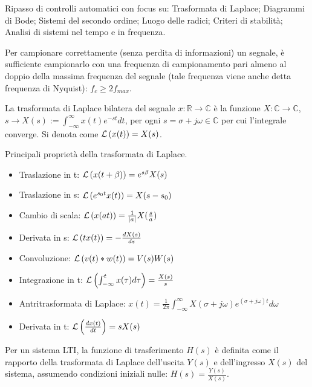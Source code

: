 Ripasso di controlli automatici con focus su: Trasformata di Laplace; Diagrammi di Bode; Sistemi del secondo ordine; Luogo delle radici; Criteri di stabilità; Analisi di sistemi nel tempo e in frequenza.

\label{th_Shannon}
Per campionare correttamente (senza perdita di informazioni) un segnale, è sufficiente campionarlo con una frequenza di campionamento pari almeno al doppio della massima frequenza del segnale (tale frequenza viene anche detta frequenza di Nyquist): \(f_c \geqslant 2 f_{max}\).

La trasformata di Laplace bilatera del segnale $x:\mathbb{R} \rightarrow \mathbb{C}$ è la funzione $X:\mathbb{C} \rightarrow \mathbb{C}$, $s \rightarrow X(s) := \int^\infty_{-\infty} x(t)e^{-st} dt $, per ogni $s=\sigma + j\omega\in \mathbb{C}$ per cui l'integrale converge. Si denota come $\mathcal{L}\left(x(t)\right) = X(s)$.

Principali proprietà della trasformata di Laplace.
\begin{itemize}
    \item Traslazione in t: $\mathcal{L}\left(x(t+\beta)\right) = e^{s\beta}X(s)$
    \item Traslazione in s: $\mathcal{L}\left(e^{s_0t}x(t)\right) = X(s-s_0)$
    \item Cambio di scala: $\mathcal{L}\left(x(at)\right) = \frac{1}{\left|a\right|}X(\frac{s}{a})$
    \item Derivata in s: $\mathcal{L}\left(tx(t)\right)=-\frac{dX(s)}{ds}$
    \item Convoluzione: $\mathcal{L}\left(v(t)*w(t)\right) = V(s)W(s)$
    \item Integrazione in t: $\mathcal{L}\left(\int^t_{-\infty} x(\tau) d\tau \right)=\frac{X(s)}{s}$
    \item Antritrasformata di Laplace: $x(t)=\frac{1}{2\pi} \int^\infty_{-\infty}X(\sigma+j\omega) e^{(\sigma+j\omega)t} d\omega$
    \item Derivata in t: $\mathcal{L}\left(\frac{dx(t)}{dt}\right) = s X(s)$
\end{itemize}


Per un sistema LTI, la funzione di trasferimento \(H(s)\) è definita come il rapporto della trasformata di Laplace dell'uscita \(Y(s)\) e dell'ingresso \(X(s)\) del sistema, assumendo condizioni iniziali nulle:
\(H(s)=\frac{Y(s)}{X(s)}\).

